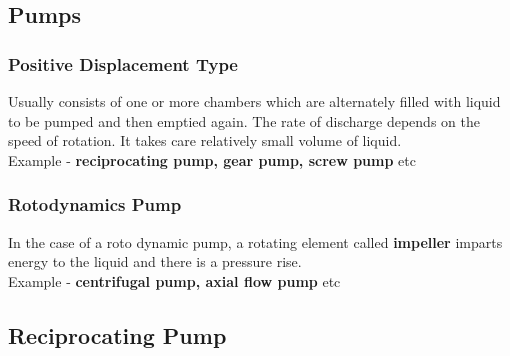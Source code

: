 \documentclass{article}
\begin{document}
\subsection*{Pumps}
\subsubsection*{Positive Displacement Type}
Usually consists of one or more chambers which are alternately filled with liquid to be pumped and then emptied again. The rate of discharge depends on the speed of rotation. It takes care relatively small volume of liquid.\\
Example - \textbf{reciprocating pump, gear pump, screw pump} etc

\subsubsection*{Rotodynamics Pump}
In the case of a roto dynamic pump, a rotating element called \textbf{impeller} imparts energy to the liquid and there is a pressure rise.\\
Example - \textbf{centrifugal pump, axial flow pump} etc \\

\subsection*{Reciprocating Pump}
\end{document}
